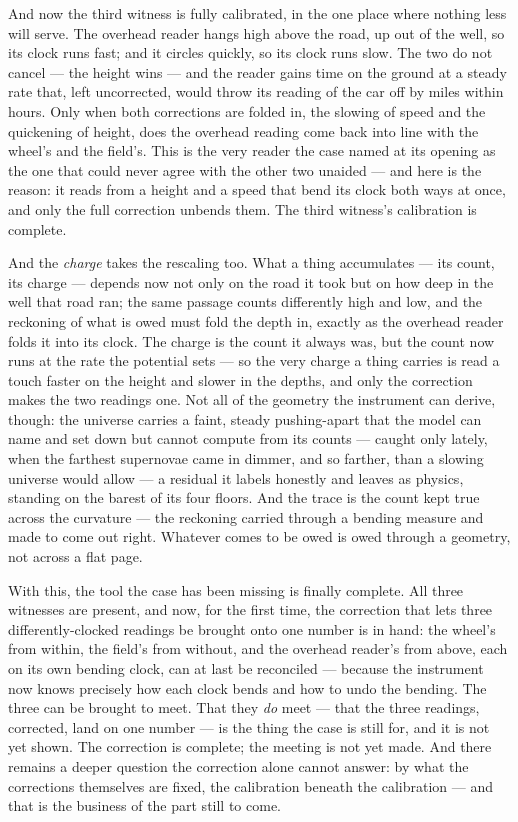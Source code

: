 And now the third witness is fully calibrated, in the one place where nothing less will serve. The overhead
reader hangs high above the road, up out of the well, so its clock runs fast; and it circles quickly, so its
clock runs slow. The two do not cancel --- the height wins --- and the reader gains time on the ground at a
steady rate that, left uncorrected, would throw its reading of the car off by miles within hours. Only when both
corrections are folded in, the slowing of speed and the quickening of height, does the overhead reading come
back into line with the wheel's and the field's. This is the very reader the case named at its opening as the
one that could never agree with the other two unaided --- and here is the reason: it reads from a height and a
speed that bend its clock both ways at once, and only the full correction unbends them. The third witness's
calibration is complete.

And the \emph{charge} takes the rescaling too. What a thing accumulates --- its count, its charge --- depends
now not only on the road it took but on how deep in the well that road ran; the same passage counts differently
high and low, and the reckoning of what is owed must fold the depth in, exactly as the overhead reader folds it
into its clock. The charge is the count it always was, but the count now runs at the rate the potential sets ---
so the very charge a thing carries is read a touch faster on the height and slower in the depths, and only the
correction makes the two readings one. Not all of the geometry the instrument can derive, though: the universe
carries a faint, steady pushing-apart that the model can name and set down but cannot compute from its counts
--- caught only lately, when the farthest supernovae came in dimmer, and so farther, than a slowing universe
would allow --- a residual it labels honestly and leaves as physics, standing on the barest of its four floors. And the trace is the count kept true across the curvature --- the reckoning carried
through a bending measure and made to come out right. Whatever comes to be owed is owed through a geometry, not
across a flat page.

With this, the tool the case has been missing is finally complete. All three witnesses are present, and now, for
the first time, the correction that lets three differently-clocked readings be brought onto one number is in
hand: the wheel's from within, the field's from without, and the overhead reader's from above, each on its own
bending clock, can at last be reconciled --- because the instrument now knows precisely how each clock bends and
how to undo the bending. The three can be brought to meet. That they \emph{do} meet --- that the three readings,
corrected, land on one number --- is the thing the case is still for, and it is not yet shown. The correction is
complete; the meeting is not yet made. And there remains a deeper question the correction alone cannot answer:
by what the corrections themselves are fixed, the calibration beneath the calibration --- and that is the
business of the part still to come.


